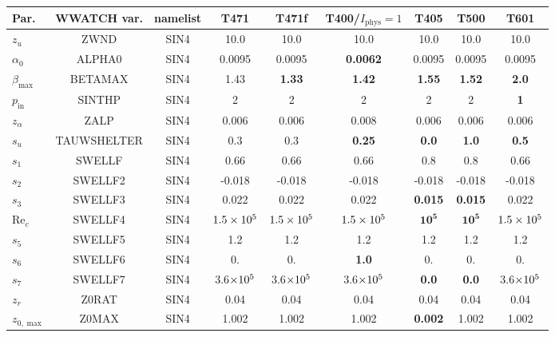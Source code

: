 \begin{landscape}
\begin{table} 
\begin{center} 
\begin{tabular}{|l|c|c|c|c|c|c|c|c|} \hline \hline
Par.         &  WWATCH var.       & namelist & T471    & T471f       & T400/$I_{\mathrm{phys}}=1$    & T405          & T500         & T601     \\
\hline
  $z_u$ &  ZWND                       & SIN4 & 10.0    & 10.0        & 10.0           & 10.0          & 10.0         & 10.0        \\
  $\alpha_0$ &  ALPHA0                & SIN4 & 0.0095  & 0.0095      & \textbf{0.0062}& 0.0095        &  0.0095      & 0.0095      \\
  $\beta_{\mathrm{max}}$ & BETAMAX    & SIN4 & 1.43    &\textbf{1.33}&\textbf{1.42}   & \textbf{1.55} &\textbf{1.52} & \textbf{2.0}\\
  $p_{\mathrm{in}}$ &  SINTHP         & SIN4 & 2       & 2           & 2              & 2             &  2           & \textbf{1}  \\
  $z_\alpha$ &  ZALP                  & SIN4 & 0.006   & 0.006       & 0.008          & 0.006         &0.006         & 0.006       \\
  $s_u$ &  TAUWSHELTER                & SIN4 & 0.3     & 0.3         & \textbf{0.25}  & \textbf{0.0}  &\textbf{1.0}  & \textbf{0.5}\\
  $s_1$ &  SWELLF                     & SIN4 & 0.66    & 0.66        & 0.66           & 0.8           &  0.8         & 0.66        \\
  $s_2$ &  SWELLF2                    & SIN4 & -0.018  & -0.018      &-0.018          & -0.018        &  -0.018      &  -0.018     \\
  $s_3$ &  SWELLF3                    & SIN4 &  0.022  &  0.022      & 0.022          &\textbf{0.015} &\textbf{0.015}&  0.022      \\
  $\mathrm{Re}_c$ &  SWELLF4          & SIN4 &$1.5\times 10^5$& $1.5\times 10^5$   & $1.5\times 10^5$      &$\mathbf{10^5}$&$\mathbf{10^5}$&  $1.5\times 10^5$ \\
  $s_5$ &  SWELLF5                    & SIN4 & 1.2     & 1.2         & 1.2            & 1.2           &  1.2         & 1.2         \\
  $s_6$ &  SWELLF6                    & SIN4 & 0.      & 0.          & \textbf{1.0}   & 0.            & 0.           & 0.          \\
  $s_7$ &  SWELLF7                    & SIN4 &3.6$\times 10^5$&3.6$\times 10^5$    & 3.6$\times 10^5$      &\textbf{0.0}   &\textbf{0.0}  & 3.6$\times 10^5$   \\
  $z_r$ &  Z0RAT                      & SIN4 & 0.04    & 0.04        & 0.04           & 0.04          &  0.04        &   0.04      \\
  $z_{0,\max}$ &  Z0MAX               & SIN4 & 1.002   & 1.002       & 1.002          &\textbf{0.002} &  1.002       &  1.002      \\
\hline
\end{tabular}  


\end{center}
\end{table}
\end{landscape}
